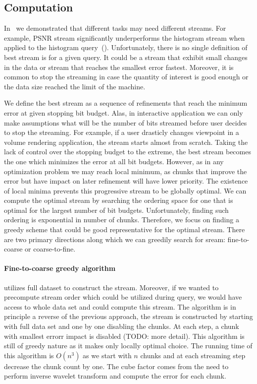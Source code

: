 \subsection{Computation}
In~ we demonstrated that different tasks may need different streams. For example,
PSNR stream significantly underperforms the histogram stream when applied to the histogram
query~().
Unfortunately, there is no single definition of best stream is for a given query. It could be a stream that
exhibit small changes in the data or stream that reaches the smallest error fastest.
Moreover, it is common to stop the streaming in case the quantity of interest is good enough or the data size
reached the limit of the machine.

We define the best stream as
a sequence of refinements that reach the minimum error at given stopping bit budget. Alas, in interactive application
we can only make assumptions what will be the number of bits streamed before user decides to stop the streaming. For
example, if a user drasticly changes viewpoint in a volume rendering application, the stream starts almost from scratch.
Taking the lack of control over the stopping budget to the extreme, the best stream becomes the one which minimizes
the error at all bit budgets. However, as in any optimization problem we may reach local minimum, as
chunks that improve the error but have impact on later refinement will have lower priority. The existence of local
minima prevents this progressive stream to be globally optimal.
We can compute the optimal stream by searching the ordering space for one that is optimal for the largest number
of bit budgets. Unfortunately, finding such ordering is exponential in number of chunks. Therefore, we focus on
finding a greedy scheme that could be good representative for the optimal stream. There are two primary directions
along which we can greedily search for sream: fine-to-coarse or coarse-to-fine.

\paragraph*{Fine-to-coarse greedy algorithm} utilizes full dataset to construct the stream.
Moreover,
if we wanted to precompute stream order which could be utilized during query, we would have access to whole
data set and could compute this stream. The algorithm is in principle a reverse of the previous approach, the
stream is constructed by starting with full data set and one by one disabling the chunks. At each step, a chunk
with smallest errorr impact is disabled (TODO: more detail). This algorithm is still of greedy nature as it
makes only locally optimal choice.
The running time of this algorithm is $O(n^3)$ as we start with $n$ chunks
and at each streaming step decrease the chunk count by one. The cube factor comes from the need to perform inverse
wavelet transform and compute the error for each chunk.

